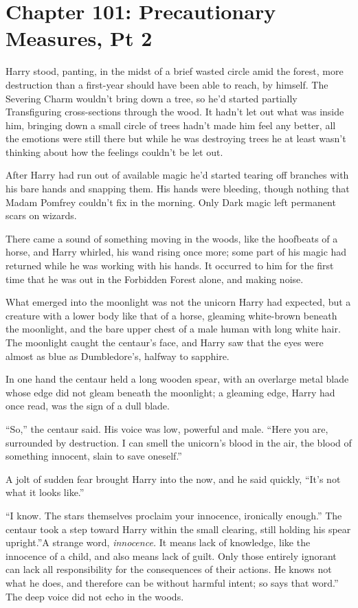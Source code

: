 \chapter{Chapter 101: Precautionary Measures, Pt 2}
Harry stood, panting, in the midst of a brief wasted circle amid the
forest, more destruction than a first-year should have been able to
reach, by himself. The Severing Charm wouldn't bring down a tree, so
he'd started partially Transfiguring cross-sections through the wood. It
hadn't let out what was inside him, bringing down a small circle of
trees hadn't made him feel any better, all the emotions were still there
but while he was destroying trees he at least wasn't thinking about how
the feelings couldn't be let out.

After Harry had run out of available magic he'd started tearing off
branches with his bare hands and snapping them. His hands were bleeding,
though nothing that Madam Pomfrey couldn't fix in the morning. Only Dark
magic left permanent scars on wizards.

There came a sound of something moving in the woods, like the hoofbeats
of a horse, and Harry whirled, his wand rising once more; some part of
his magic had returned while he was working with his hands. It occurred
to him for the first time that he was out in the Forbidden Forest alone,
and making noise.

What emerged into the moonlight was not the unicorn Harry had expected,
but a creature with a lower body like that of a horse, gleaming
white-brown beneath the moonlight, and the bare upper chest of a male
human with long white hair. The moonlight caught the centaur's face, and
Harry saw that the eyes were almost as blue as Dumbledore's, halfway to
sapphire.

In one hand the centaur held a long wooden spear, with an overlarge
metal blade whose edge did not gleam beneath the moonlight; a gleaming
edge, Harry had once read, was the sign of a dull blade.

``So,'' the centaur said. His voice was low, powerful and male. ``Here
you are, surrounded by destruction. I can smell the unicorn's blood in
the air, the blood of something innocent, slain to save oneself.''

A jolt of sudden fear brought Harry into the now, and he said quickly,
``It's not what it looks like.''

``I know. The stars themselves proclaim your innocence, ironically
enough.'' The centaur took a step toward Harry within the small
clearing, still holding his spear upright.''A strange word,
\emph{innocence.} It means lack of knowledge, like the innocence of a
child, and also means lack of guilt. Only those entirely ignorant can
lack all responsibility for the consequences of their actions. He knows
not what he does, and therefore can be without harmful intent; so says
that word.'' The deep voice did not echo in the woods.


